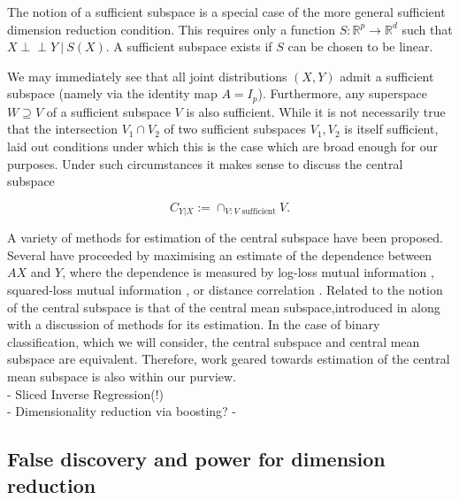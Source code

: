 \documentclass[12pt]{article}
\begin{document}
The notion of a sufficient subspace is a special case of the more general sufficient dimension reduction condition. This requires only a function $S:\mathbb{R}^p\rightarrow \mathbb{R}^d$ such that $X \perp\!\!\!\perp Y\ | \ S(X)$. A sufficient subspace exists if $S$ can be chosen to be linear. 

We may immediately see that all joint distributions $(X,Y)$ admit a sufficient subspace (namely via the identity map $A= I_p$). Furthermore, any superspace $W \supseteq V$ of a sufficient subspace $V$ is also sufficient. While it is not necessarily true that the intersection $V_1 \cap V_2$ of two sufficient subspaces $V_1,V_2$ is itself sufficient, \citet[Lemma 2]{cook_graphics_1996} laid out conditions under which this is the case which are broad enough for our purposes. Under such circumstances it makes sense to discuss the central subspace 

\begin{equation*}
    C_{Y|X} := \cap_{V: V\text{ sufficient}}V.
\end{equation*}

A variety of methods for estimation of the central subspace have been proposed. Several have proceeded by maximising an estimate of the dependence between $AX$ and $Y$, where the dependence is measured by log-loss mutual information \citep{torkkola_feature_2003, suzuki_approximating_2008}, squared-loss mutual information \citep{suzuki_sufficient_2012, yamada_sufficient_2011}, or distance correlation \citep{vepakomma_supervised_2018}. Related to the notion of the central subspace is that of the central mean subspace,introduced in \citet{cook_dimension_2002} along with a discussion of methods for its estimation. In the case of binary classification, which we will consider, the central subspace and central mean subspace are equivalent. Therefore, work geared towards estimation of the central mean subspace \citep[see for example][]{ma_estimation_2014} is also within our purview.\\

- Sliced Inverse Regression(!) \\

- Dimensionality reduction via boosting? -\\

\subsection{False discovery and power for dimension reduction}
\citep{taeb_false_2020}
\end{document}
